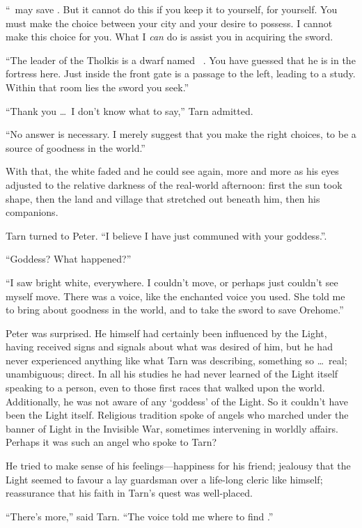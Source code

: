 ``\kildir\ may save \korbarthrond.  But it cannot do this if you keep it to yourself, for yourself.  You must make the choice between your city and your desire to possess.  I cannot make this choice for you.  What I \emph{can} do is assist you in acquiring the sword.

``The leader of the Tholkis is a dwarf named \mothzam\ \driktur. You have guessed that he is in the fortress here.  Just inside the front gate is a passage to the left, leading to a study.  Within that room lies the sword you seek.''

``Thank you \ldots\ I don't know what to say,'' Tarn admitted.

``No answer is necessary.  I merely suggest that you make the right choices, to be a source of goodness in the world.''

With that, the white faded and he could see again, more and more as his eyes adjusted to the relative darkness of the real-world afternoon: first the sun took shape, then the land and village that stretched out beneath him, then his companions.

Tarn turned to Peter. ``I believe I have just communed with your goddess.''.

``Goddess?  What happened?''

``I saw bright white, everywhere.  I couldn't move, or perhaps just couldn't see myself move. There was a voice, like the enchanted voice you used.  She told me to bring about goodness in the world, and to take the sword to save Orehome.''

Peter was surprised.  He himself had certainly been influenced by the Light, having received signs and signals about what was desired of him, but he had never experienced anything like what Tarn was describing, something so \ldots\ real; unambiguous; direct.  In all his studies he had never learned of the Light itself speaking to a person, even to those first races that walked upon the world.  Additionally, he was not aware of any `goddess' of the Light.  So it couldn't have been the Light itself.  Religious tradition spoke of angels who marched under the banner of Light in the Invisible War, sometimes intervening in worldly affairs.  Perhaps it was such an angel who spoke to Tarn?

He tried to make sense of his feelings---happiness for his friend; jealousy that the Light seemed to favour a lay guardsman over a life-long cleric like himself; reassurance that his faith in Tarn's quest was well-placed.

``There's more,'' said Tarn.  ``The voice told me where to find \kildir.''

